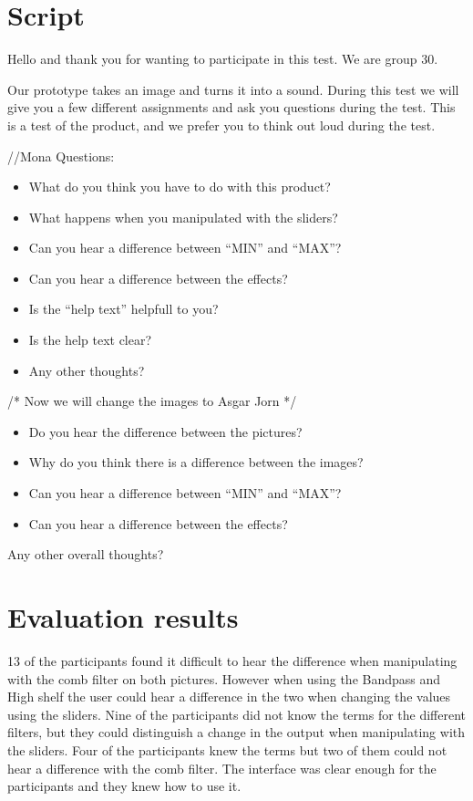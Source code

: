 \section{Script}

Hello and thank you for wanting to participate in this test. We are group 30.

Our prototype takes an image and turns it into a sound. During this test we will give you a few different assignments and ask you questions during the test. This is a test of the product, and we prefer you to think out loud during the test.

//Mona
Questions: 


\begin{itemize}
\item What do you think you have to do with this product?
\item What happens when you manipulated with the sliders?
\item Can you hear a difference between “MIN” and “MAX”?
\item Can you hear a difference between the effects?
\item Is the “help text” helpfull to you?
\item Is the help text clear?
\item Any other thoughts?
\end{itemize}



/* Now we will change the images to Asgar Jorn */
\begin{itemize}
\item Do you hear the difference between the pictures?
\item Why do you think there is a difference between the images?
\item Can you hear a difference between “MIN” and “MAX”?
\item Can you hear a difference between the effects?
\end{itemize}


Any other overall thoughts?


\section{Evaluation results}

13 of the participants found it difficult to hear the difference when manipulating with the comb filter on both pictures. However when using the Bandpass and High shelf the user could hear a difference in the two when changing the values using the sliders. Nine of the participants did not know the terms for the different filters, but they could distinguish a change in the output when manipulating with the sliders. Four of the participants knew the terms but two of them could not hear a difference with the comb filter. The interface was clear enough for the participants and they knew how to use it. 

